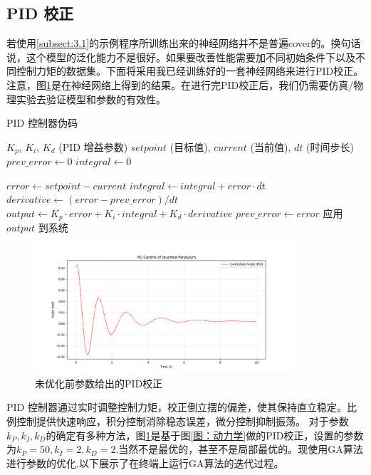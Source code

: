 \documentclass[12pt, AutoFakeBold=4]{ctexart}
\begin{document}
\subsection{PID 校正}
若使用\ref{subsect:3.1}的示例程序所训练出来的神经网络并不是普遍cover的。换句话说，这个模型的泛化能力不是很好。如果要改善性能需要加不同初始条件下以及不同控制力矩的数据集。下面将采用我已经训练好的一套神经网络来进行PID校正。注意，图\ref{图：PID}是在神经网络上得到的结果。在进行完PID校正后，我们仍需要仿真/物理实验去验证模型和参数的有效性。
\begin{algorithm}
	\caption{PID 控制器伪码}
	\begin{algorithmic}[1]
		\REQUIRE $K_p$, $K_i$, $K_d$ (PID 增益参数)
		\REQUIRE $setpoint$ (目标值), $current$ (当前值), $dt$ (时间步长)
		\STATE $prev\_error \gets 0$ 
		\STATE $integral \gets 0$ 
		
		\STATE $error \gets setpoint - current$ 
		\STATE $integral \gets integral + error \cdot dt$ 
		\STATE $derivative \gets (error - prev\_error) / dt$ 
		\STATE $output \gets K_p \cdot error + K_i \cdot integral + K_d \cdot derivative$ 
		\STATE $prev\_error \gets error$ 
		\STATE 应用 $output$ 到系统
		\ENDWHILE
	\end{algorithmic}
\end{algorithm}
\begin{figure}[htpb]
	\centering
	\includegraphics[width=0.85\textwidth]{PID.png}
	\caption{未优化前参数给出的PID校正}
	\label{图：PID}
\end{figure}

PID 控制器通过实时调整控制力矩，校正倒立摆的偏差，使其保持直立稳定。比例控制提供快速响应，积分控制消除稳态误差，微分控制抑制振荡。
 对于参数$k_P,k_I,k_D$的确定有多种方法，图\ref{图：PID}是基于图\ref{图：动力学}做的PID校正，设置的参数为$k_P=50,k_I=2,k_D=2$.当然不是最优的，甚至不是局部最优的。现使用GA算法进行参数的优化,以下展示了在终端上运行GA算法的迭代过程。\par
 
\end{document}
